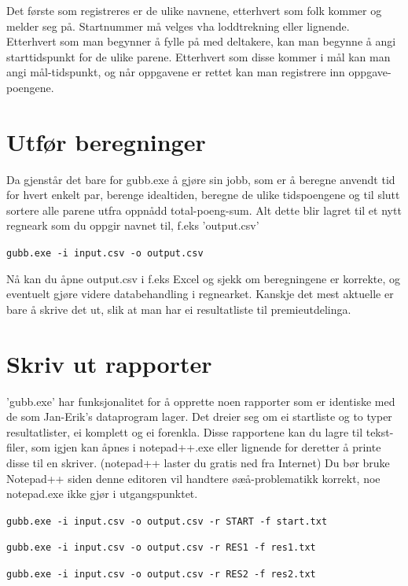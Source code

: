 \documentclass[12pt]{book}
\begin{document}
Det første som registreres er de ulike navnene, etterhvert som folk kommer og melder seg på. Startnummer må velges vha loddtrekning eller lignende. Etterhvert som man begynner å fylle på med deltakere, kan man begynne å angi starttidspunkt for de ulike parene. Etterhvert som disse kommer i mål kan man angi mål-tidspunkt, og når oppgavene er rettet kan man registrere inn oppgave-poengene.

\newpage

\section{Utfør beregninger}

Da gjenstår det bare for gubb.exe å gjøre sin jobb, som er å beregne anvendt tid for hvert enkelt par, berenge idealtiden, beregne de ulike tidspoengene og til slutt sortere alle parene utfra oppnådd total-poeng-sum. Alt dette blir lagret til et nytt regneark som du oppgir navnet til, f.eks 'output.csv'

\begin{alltt}
\texttt{gubb.exe -i input.csv -o output.csv  {\Return} }
\end{alltt}

Nå kan du åpne output.csv i f.eks Excel og sjekk om beregningene er korrekte, og eventuelt gjøre videre databehandling i regnearket. Kanskje det mest aktuelle er bare å skrive det ut, slik at man har ei resultatliste til premieutdelinga.

\section{Skriv ut rapporter}

'gubb.exe' har funksjonalitet for å opprette noen rapporter som er identiske med de som Jan-Erik's dataprogram lager. Det dreier seg om ei startliste og to typer resultatlister, ei komplett og ei forenkla. Disse rapportene kan du lagre til tekst-filer, som igjen kan åpnes i notepad++.exe eller lignende for deretter å printe disse til en skriver. (notepad++ laster du gratis ned fra Internet) Du bør bruke Notepad++ siden denne editoren vil handtere øæå-problematikk korrekt, noe notepad.exe ikke gjør i utgangspunktet.

\begin{alltt}
\texttt{gubb.exe -i input.csv -o output.csv -r START -f start.txt  {\Return} }

\texttt{gubb.exe -i input.csv -o output.csv -r RES1 -f res1.txt  {\Return} }

\texttt{gubb.exe -i input.csv -o output.csv -r RES2 -f res2.txt  {\Return} }
\end{alltt}
\end{document}
